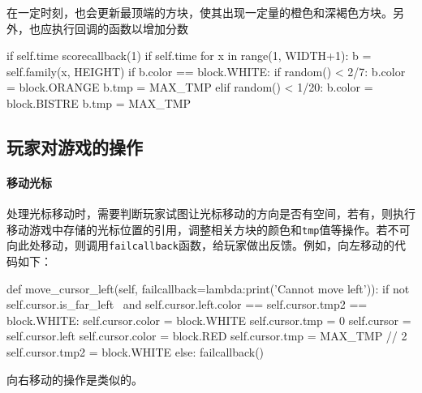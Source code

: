 \documentclass[UTF8]{article}
\begin{document}
在一定时刻，也会更新最顶端的方块，使其出现一定量的橙色和深褐色方块。另外，也应执行回调的函数以增加分数
\begin{python}
        if self.time %
            scorecallback(1)
        if self.time %
            for x in range(1, WIDTH+1):
                b = self.family(x, HEIGHT)
                if b.color == block.WHITE:
                    if random() < 2/7:
                        b.color = block.ORANGE
                        b.tmp = MAX_TMP
                    elif random() < 1/20:
                        b.color = block.BISTRE
                        b.tmp = MAX_TMP
\end{python}

\subsection{玩家对游戏的操作}

\paragraph{移动光标} 处理光标移动时，需要判断玩家试图让光标移动的方向是否有空间，若有，则执行移动游戏中存储的光标位置的引用，调整相关方块的颜色和\texttt{tmp}值等操作。若不可向此处移动，则调用\texttt{failcallback}函数，给玩家做出反馈。例如，向左移动的代码如下：
\begin{python}
    def move_cursor_left(self, failcallback=lambda:print('Cannot move left')):
        if not self.cursor.is_far_left \
            and self.cursor.left.color == self.cursor.tmp2 == block.WHITE:
            self.cursor.color = block.WHITE
            self.cursor.tmp = 0
            self.cursor = self.cursor.left
            self.cursor.color = block.RED
            self.cursor.tmp = MAX_TMP // 2
            self.cursor.tmp2 = block.WHITE
        else:
            failcallback()
\end{python}

向右移动的操作是类似的。
\end{document}
